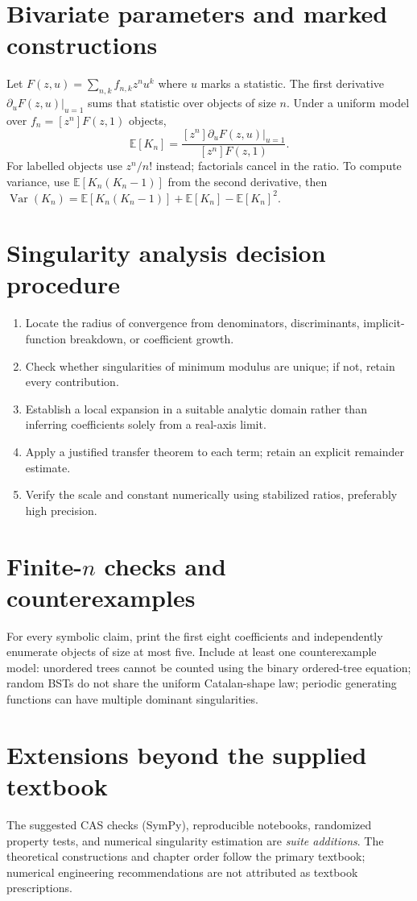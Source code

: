 \documentclass[11pt]{article}
\providecommand{\Expect}{\mathbb{E}}
\providecommand{\Var}{\operatorname{Var}}
\begin{document}
\section{Bivariate parameters and marked constructions}
Let $F(z,u)=\sum_{n,k}f_{n,k}z^nu^k$ where $u$ marks a statistic. The first derivative $\partial_u F(z,u)|_{u=1}$ sums that statistic over objects of size $n$. Under a uniform model over $f_n=[z^n]F(z,1)$ objects,
\[
\Expect[K_n]=\frac{[z^n]\partial_u F(z,u)|_{u=1}}{[z^n]F(z,1)}.
\]
For labelled objects use $z^n/n!$ instead; factorials cancel in the ratio. To compute variance, use $\Expect[K_n(K_n-1)]$ from the second derivative, then $\Var(K_n)=\Expect[K_n(K_n-1)]+\Expect[K_n]-\Expect[K_n]^2$.
\section{Singularity analysis decision procedure}
\begin{enumerate}
\item Locate the radius of convergence from denominators, discriminants, implicit-function breakdown, or coefficient growth.
\item Check whether singularities of minimum modulus are unique; if not, retain every contribution.
\item Establish a local expansion in a suitable analytic domain rather than inferring coefficients solely from a real-axis limit.
\item Apply a justified transfer theorem to each term; retain an explicit remainder estimate.
\item Verify the scale and constant numerically using stabilized ratios, preferably high precision.
\end{enumerate}
\section{\texorpdfstring{Finite-$n$ checks and counterexamples}{Finite-n checks and counterexamples}}
For every symbolic claim, print the first eight coefficients and independently enumerate objects of size at most five. Include at least one counterexample model: unordered trees cannot be counted using the binary ordered-tree equation; random BSTs do not share the uniform Catalan-shape law; periodic generating functions can have multiple dominant singularities.
\section{Extensions beyond the supplied textbook}
The suggested CAS checks (SymPy), reproducible notebooks, randomized property tests, and numerical singularity estimation are \emph{suite additions}. The theoretical constructions and chapter order follow the primary textbook; numerical engineering recommendations are not attributed as textbook prescriptions.
\end{document}
